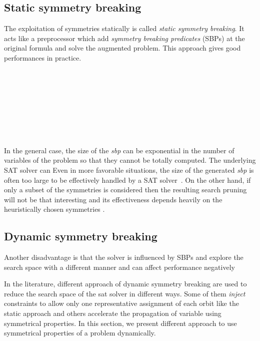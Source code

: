 \subsection{Static symmetry breaking}
The exploitation of symmetries statically is called \emph{static symmetry breaking}.
It acts like a preprocessor which add \emph{symmetry breaking predicates} (SBPs) at the 
original formula and solve the augmented problem. 
This approach gives good performances in practice.

\\
\\
\\
\\

\\

\\
\\



In the general case,
the size of the \textit{sbp} can be exponential in the number of variables of
the problem so that they cannot be totally computed. The underlying SAT solver can 
 Even in more favorable
situations, the size of the generated \textit{sbp} is often too large to be
effectively handled by a SAT solver~\cite{Luks2004}. On the other hand, if
only a subset of the symmetries is considered then the resulting search pruning
will not be that interesting and its effectiveness depends heavily on the
heuristically chosen symmetries \cite{biere2009handbook}.




\subsection{Dynamic symmetry breaking}


Another disadvantage is that the solver is influenced by SBPs and explore the search space with a different 
manner and can affect performance negatively 

In the literature, different approach of dynamic symmetry breaking are used to reduce the search space
of the sat solver in different ways. Some of them \textit{inject} constraints to allow only one representative assignment of each orbit like the static approach and others accelerate the propagation of variable using symmetrical properties. In this section, we present different approach to use symmetrical properties of a problem 
dynamically.


